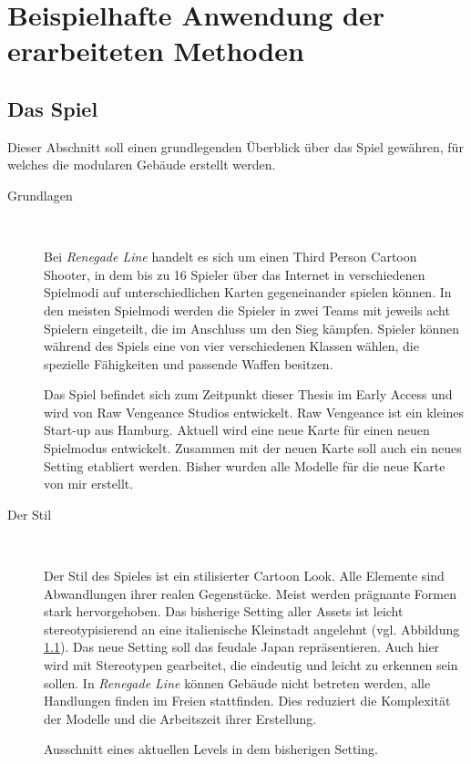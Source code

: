 \chapter{Beispielhafte Anwendung der erarbeiteten Methoden}
\section{Das Spiel}
Dieser Abschnitt soll einen grundlegenden Überblick über das Spiel gewähren, für welches die modularen Gebäude erstellt werden.
\begin{description}
\item[Grundlagen]~\par
Bei \textit{Renegade Line} handelt es sich um einen Third Person Cartoon Shooter, in dem bis zu 16 Spieler über das Internet in verschiedenen Spielmodi auf unterschiedlichen Karten gegeneinander spielen können. In den meisten Spielmodi werden die Spieler in zwei Teams mit jeweils acht Spielern eingeteilt, die im Anschluss um den Sieg kämpfen. Spieler können während des Spiels eine von vier verschiedenen Klassen wählen, die spezielle Fähigkeiten und passende Waffen besitzen.
\par
Das Spiel befindet sich zum Zeitpunkt dieser Thesis im Early Access und wird von Raw Vengeance Studios entwickelt. Raw Vengeance ist ein kleines Start-up aus Hamburg. Aktuell wird eine neue Karte für einen neuen Spielmodus entwickelt. Zusammen mit der neuen Karte soll auch ein neues Setting etabliert werden. Bisher wurden alle Modelle für die neue Karte von mir erstellt.
\item[Der Stil]~\par
Der Stil des Spieles ist ein stilisierter Cartoon Look. Alle Elemente sind Abwandlungen ihrer realen Gegenstücke. Meist werden prägnante Formen stark hervorgehoben. Das bisherige Setting aller Assets ist leicht stereotypisierend an eine italienische Kleinstadt angelehnt (vgl. Abbildung \ref{altSetting}). Das neue Setting soll das feudale Japan repräsentieren. Auch hier wird mit Stereotypen gearbeitet, die eindeutig und leicht zu erkennen sein sollen. In \textit{Renegade Line} können Gebäude nicht betreten werden, alle Handlungen finden im Freien stattfinden. Dies reduziert die Komplexität der Modelle und die Arbeitszeit ihrer Erstellung.
\end{description}
\begin{figure}[!h]
\centering
  \caption{Ausschnitt eines aktuellen Levels in dem bisherigen Setting.}
	\label{altSetting}
\end{figure}
